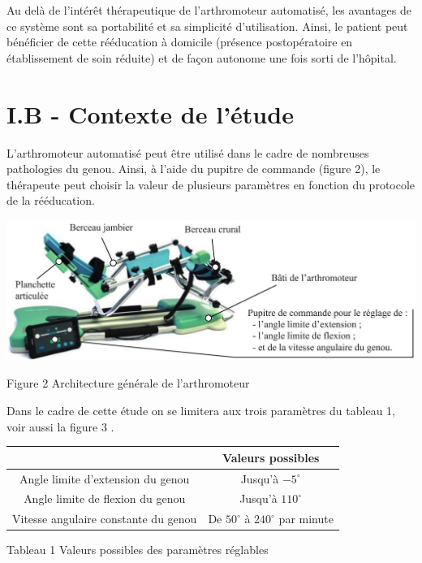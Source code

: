 \documentclass[10pt]{article}
\begin{document}
Au delà de l'intérêt thérapeutique de l'arthromoteur automatisé, les avantages de ce système sont sa portabilité et sa simplicité d'utilisation. Ainsi, le patient peut bénéficier de cette rééducation à domicile (présence postopératoire en établissement de soin réduite) et de façon autonome une fois sorti de l'hôpital.

\section*{I.B - Contexte de l'étude}
L'arthromoteur automatisé peut être utilisé dans le cadre de nombreuses pathologies du genou. Ainsi, à l'aide du pupitre de commande (figure 2), le thérapeute peut choisir la valeur de plusieurs paramètres en fonction du protocole de la rééducation.

\begin{center}
\includegraphics[max width=\textwidth]{2024_07_14_a83aebba33898893d39fg-01(1)}
\end{center}

Figure 2 Architecture générale de l'arthromoteur

Dans le cadre de cette étude on se limitera aux trois paramètres du tableau 1, voir aussi la figure 3 .

\begin{center}
\begin{tabular}{|c|c|}
\hline
 & Valeurs possibles \\
\hline
Angle limite d'extension du genou & Jusqu'à $-5^{\circ}$ \\
\hline
Angle limite de flexion du genou & Jusqu'à $110^{\circ}$ \\
\hline
Vitesse angulaire constante du genou & De $50^{\circ}$ à $240^{\circ}$ par minute \\
\hline
\end{tabular}
\end{center}

Tableau 1 Valeurs possibles des paramètres réglables
\end{document}

